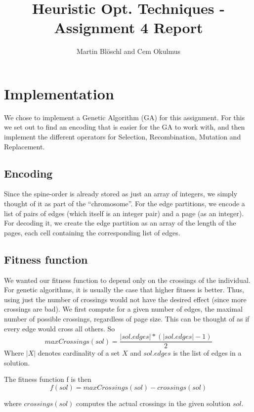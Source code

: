 \documentclass [11pt]{article}
\begin{document}
\title{ Heuristic Opt. Techniques - Assignment 4 Report}
\author{ Martin Blöschl and Cem Okulmus }

\maketitle
\thispagestyle{empty}


\section{Implementation}
We chose to implement a Genetic Algorithm (GA) for this assignment. For this we set out to find an encoding that is easier for the GA to work with, and then implement the different operators for Selection, Recombination, Mutation and Replacement. 

\subsection{Encoding}

Since the spine-order is already stored as just an array of integers, we simply thought of it as part of the ``chromosome''. For the edge partitions, we encode a list of pairs of edges (which itself is an integer pair) and a page (as an integer). For decoding it, we create the edge partition as an array of the length of the pages, each cell containing the corresponding list of edges. 

\subsection{Fitness function}

We wanted our fitness function to depend only on the crossings of the individual. For genetic algorithms, it is usually the case that higher fitness is better. Thus, using just the number of crossings would not have the desired effect (since more crossings are bad). We first compute for a given number of edges, the maximal number of possible crossings, regardless of page size. This can be thought of as if every edge would cross all others. So 
\[
	maxCrossings(sol) = \frac{|sol.edges| * (|sol.edges| - 1)}{2} 
\]
Where $|X|$ denotes cardinality of a set $X$ and $sol.edges$ is the list of edges in a solution.

The fitness function f is then 
\[
	f(sol) = maxCrossings(sol) - crossings(sol)
 \]

 where $crossings(sol)$ computes the actual crossings in the given solution $sol$.
\end{document}
